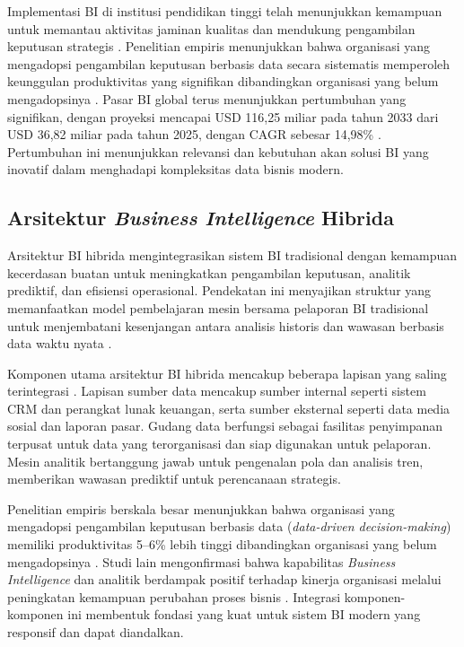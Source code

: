 Implementasi BI di institusi pendidikan tinggi telah menunjukkan kemampuan untuk memantau aktivitas jaminan kualitas dan mendukung pengambilan keputusan strategis \autocite{sorour2020business}. Penelitian empiris menunjukkan bahwa organisasi yang mengadopsi pengambilan keputusan berbasis data secara sistematis memperoleh keunggulan produktivitas yang signifikan dibandingkan organisasi yang belum mengadopsinya \autocite{gul2023from}. Pasar BI global terus menunjukkan pertumbuhan yang signifikan, dengan proyeksi mencapai USD 116,25 miliar pada tahun 2033 dari USD 36,82 miliar pada tahun 2025, dengan CAGR sebesar 14,98\% \autocite{Straits2024}. Pertumbuhan ini menunjukkan relevansi dan kebutuhan akan solusi BI yang inovatif dalam menghadapi kompleksitas data bisnis modern.

\subsection{Arsitektur \textit{Business Intelligence} Hibrida}

Arsitektur BI hibrida mengintegrasikan sistem BI tradisional dengan kemampuan kecerdasan buatan untuk meningkatkan pengambilan keputusan, analitik prediktif, dan efisiensi operasional. Pendekatan ini menyajikan struktur yang memanfaatkan model pembelajaran mesin bersama pelaporan BI tradisional untuk menjembatani kesenjangan antara analisis historis dan wawasan berbasis data waktu nyata \autocite{sahoo2023artificial}.

Komponen utama arsitektur BI hibrida mencakup beberapa lapisan yang saling terintegrasi \autocite{sahoo2023artificial}. Lapisan sumber data mencakup sumber internal seperti sistem CRM dan perangkat lunak keuangan, serta sumber eksternal seperti data media sosial dan laporan pasar. Gudang data berfungsi sebagai fasilitas penyimpanan terpusat untuk data yang terorganisasi dan siap digunakan untuk pelaporan. Mesin analitik bertanggung jawab untuk pengenalan pola dan analisis tren, memberikan wawasan prediktif untuk perencanaan strategis. 

Penelitian empiris berskala besar menunjukkan bahwa organisasi yang mengadopsi pengambilan keputusan berbasis data (\textit{data-driven decision-making}) memiliki produktivitas 5--6\% lebih tinggi dibandingkan organisasi yang belum mengadopsinya \autocite{gul2023from}. Studi lain mengonfirmasi bahwa kapabilitas \textit{Business Intelligence} dan analitik berdampak positif terhadap kinerja organisasi melalui peningkatan kemampuan perubahan proses bisnis \autocite{sahoo2023artificial}. Integrasi komponen-komponen ini membentuk fondasi yang kuat untuk sistem BI modern yang responsif dan dapat diandalkan.

